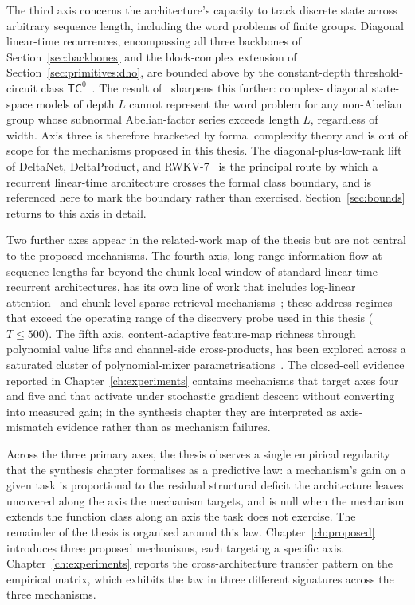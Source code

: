 The third axis concerns the architecture's capacity to track
discrete state across arbitrary sequence length, including the word
problems of finite groups. Diagonal linear-time recurrences,
encompassing all three backbones of Section~\ref{sec:backbones} and
the block-complex extension of Section~\ref{sec:primitives:dho}, are
bounded above by the constant-depth threshold-circuit class
$\mathsf{TC}^{0}$~\cite{merrill2024illusion}. The result
of~\citet{sarrof2024expressive} sharpens this further: complex-
diagonal state-space models of depth $L$ cannot represent the word
problem for any non-Abelian group whose subnormal Abelian-factor
series exceeds length $L$, regardless of width. Axis three is
therefore bracketed by formal complexity theory and is out of scope
for the mechanisms proposed in this thesis. The diagonal-plus-low-rank
lift of DeltaNet, DeltaProduct, and
RWKV-7~\cite{schlag2021deltanet, yang2024deltanet, peng2025rwkv7} is
the principal route by which a recurrent linear-time architecture
crosses the formal class boundary, and is referenced here to mark
the boundary rather than exercised. Section~\ref{sec:bounds} returns
to this axis in detail.

Two further axes appear in the related-work map of the thesis but
are not central to the proposed mechanisms. The fourth axis,
long-range information flow at sequence lengths far beyond the
chunk-local window of standard linear-time recurrent architectures,
has its own line of work that includes log-linear
attention~\cite{guo2025loglinear} and chunk-level sparse retrieval
mechanisms~\cite{hou2025rwkvx, hu2025hsa}; these address regimes
that exceed the operating range of the discovery probe used in this
thesis ($T \le 500$). The fifth axis, content-adaptive feature-map
richness through polynomial value lifts and channel-side
cross-products, has been explored across a saturated cluster of
polynomial-mixer parametrisations~\cite{mongaras2025expressiveness, picard2026pom, hammoud2025dont, zhang2025hla}.
The closed-cell evidence reported in Chapter~\ref{ch:experiments}
contains mechanisms that target axes four and five and that activate
under stochastic gradient descent without converting into measured
gain; in the synthesis chapter they are interpreted as axis-mismatch
evidence rather than as mechanism failures.

Across the three primary axes, the thesis observes a single
empirical regularity that the synthesis chapter formalises as a
predictive law: a mechanism's gain on a given task is proportional
to the residual structural deficit the architecture leaves uncovered
along the axis the mechanism targets, and is null when the mechanism
extends the function class along an axis the task does not
exercise. The remainder of the thesis is organised around this law.
Chapter~\ref{ch:proposed} introduces three proposed mechanisms, each
targeting a specific axis. Chapter~\ref{ch:experiments} reports the
cross-architecture transfer pattern on the empirical matrix, which
exhibits the law in three different signatures across the three
mechanisms.


